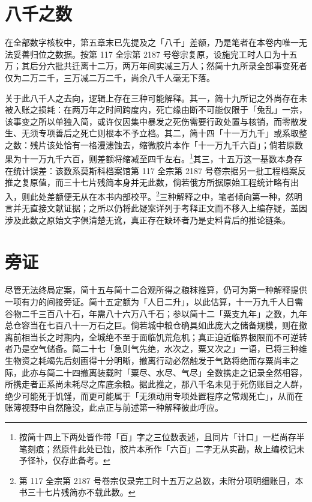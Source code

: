\section{八千之数}

在全部数字核校中，第五章末已先提及之「八千」差额，乃是笔者在本卷内唯一无法妥善归位之数据。按第 117 全宗第 2187 号卷宗复原，设施完工时人口为十五万；其后分六批共迁离十二万，两万年间实减三万人；然简十九所录全部事变死者仅为二万二千，三万减二万二千，尚余八千人毫无下落。

关于此八千人之去向，逻辑上存在三种可能解释。其一，简十九所记之外尚存在未被入账之损耗：在两万年之时间跨度内，死亡缘由断不可能仅限于「兔乱」一宗，该事变之所以单独入简，或许仅因集中暴发之死伤需要行政处置与核销，而零散发生、无须专项善后之死亡则根本不予立档。其二，简十四「十一万九千」或系取整之数：残片该处恰有一格漫漶蚀去，缩微胶片本作「十一万九千六百」；倘若原数果为十一万九千六百，则差额将缩减至四千左右。\footnote{按简十四上下两处皆作带「百」字之三位数表述，且同片「计口」一栏尚存半笔刻痕；然原件此处已蚀，胶片本所作「六百」二字无从实勘，故上编校记未予径补，仅存此备考。}其三，十五万这一基数本身存在统计误差：该数系莫斯科档案馆第 117 全宗第 2187 号卷宗据另一批工程档案反推之复原值，而三十七片残简本身并无此数，倘若俄方所据原始工程统计略有出入，则此处差额便无从在本书内部校平。\footnote{第 117 全宗第 2187 号卷宗仅录完工时十五万之总数，未附分项明细账目，本书三十七片残简亦不载此数。}三种解释之中，笔者倾向第一种，然明言并无直接文献证据；之所以仍将此疑案详列于考释正文而不移入上编存疑，盖因涉及此数之原始文字俱清楚无讹，真正存在缺环者乃是史料背后的推论链条。

\section{旁证}

尽管无法终局定案，简十五与简十二合观所得之粮秣推算，仍可为第一种解释提供一项有力的间接旁证。简十五定额为「人日二升」，以此估算，十一万九千人日需谷物二千三百八十石，年需八十六万八千石；参以简十二「粟支九年」之数，九年总仓容当在七百八十一万石之巨。倘若城中粮仓确具如此庞大之储备规模，则在撤离前相当长之时期内，全城绝不至于面临饥荒危机；真正迫近临界极限而不可逆转者乃是空气储备。简二十七「急则气先绝，水次之，粟又次之」一语，已将三种维生物资之耗竭先后刻画得十分明晰，撤离行动必然触发于气路将绝而存粟尚丰之际，此亦与简二十四撤离装载时「粟尽、水尽、气尽」全数携走之记录全然相容，所携走者正系尚未耗尽之库底余粮。据此推之，那八千名未见于死伤账目之人群，绝少可能死于饥馑，而更可能属于「无须动用专项处置程序之常规死亡」，从而在账簿视野中自然隐没，此点正与前述第一种解释彼此呼应。

